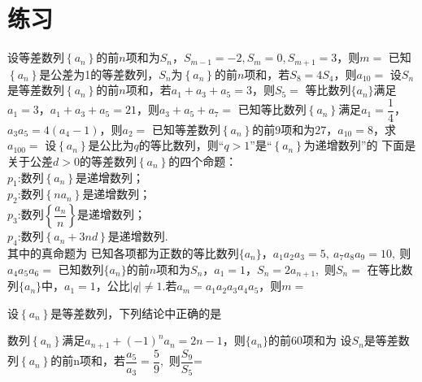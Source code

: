\documentclass{BHCexam}
\begin{document}
\section{练习}
\begin{questions}
 
\question
设等差数列$\left\{a_n\right\}$的前$n$项和为$S_n$，$S_{m-1}=-2,S_m=0,S_{m+1}=3$，则$m=$\xx
{}
\qs
已知$\left\{a_n\right\}$是公差为1的等差数列，$S_n$为$\left\{a_n\right\}$的前$n$项和，若$S_8=4S_4$，则$a_{10}=$\xx
{}
\qs 设$S_n$是等差数列$\left\{a_n\right\}$的前$n$项和，若$a_1+a_3+a_5=3$，则$S_5=$\xx
{}
\qs 等比数列$\{a_n\}$满足$a_1=3$，$a_1+a_3+a_5=21$，则$ a_3+a_5+a_7= $\xx
{}
\qs 已知等比数列$\left\{a_n\right\}$满足$a_1=\dfrac{1}{4}$，$a_3a_5=4(a_4-1)$，则$a_2=$\xx
{}
\qs
已知等差数列$ \left\{a_n\right\} $的前$ 9 $项和为$27$，$a_{10}=8$，求$a_{100}=$\xx
{}
\qs
设$ \left\{a_n\right\} $是公比为$q$的等比数列，则“$ q>1$”是“$ \left\{a_n\right\} $为递增数列”的\xx
{}
\qs
下面是关于公差$d>0$的等差数列$ \left\{a_n\right\} $的四个命题：\\
$p_1$:数列$ \left\{a_n\right\} $是递增数列；\\
$p_2$:数列$ \left\{na_n\right\} $是递增数列；\\
$p_3$:数列$ \left\{\dfrac{a_n}{n}\right\} $是递增数列；\\
$p_4$:数列$\left\{a_n+3nd\right\}$是递增数列.\\
其中的真命题为\xx
{}
\qs 已知各项都为正数的等比数列$\{a_n\}$，$a_1a_2a_3=5,~a_7a_8a_9=10,~  $则$ a_4a_5a_6= $\xx
{}
\qs 已知数列$\{a_n\}$的前$n$项和为$S_n$，$a_1=1$，$S_n=2a_{n+1}$,~则$S_n=$\xx
{}
\qs
在等比数列$\{a_n\}$中，$a_1=1$，公比$ |q|\ne 1 $.若$ a_m=a_1a_2a_3a_4a_5 $，则$ m= $\xx
{}

\qs 
设$ \left\{a_n\right\} $是等差数列，下列结论中正确的是\xx
{}

\qs 数列$ \left\{a_n\right\} $满足$ a_{n+1}+(-1)^na_n=2n-1 $，则$\{a_n\}$的前$ 60 $项和为\xx
{}
\qs 设$S_n$是等差数列$\left\{a_n\right\}$的前n项和，若$\dfrac{a_5}{a_3}=\dfrac{5}{9}$,~则$ \dfrac{S_9}{S_5} $=\xx
{}


\end{questions}
\end{document}
